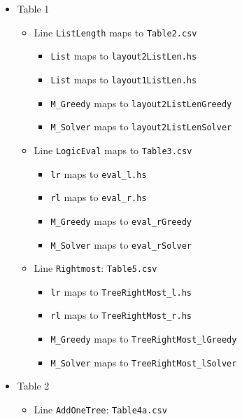 \begin{itemize}
\item
  Table 1

  \begin{itemize}
  \tightlist
  \item
    Line \texttt{ListLength} maps to \texttt{Table2.csv}

    \begin{itemize}
    \tightlist
    \item
      \texttt{List} maps to \texttt{layout2ListLen.hs}
    \item
      \texttt{List\textquotesingle{}} maps to \texttt{layout1ListLen.hs}
    \item
      \texttt{M\_Greedy} maps to \texttt{layout2ListLenGreedy}
    \item
      \texttt{M\_Solver} maps to \texttt{layout2ListLenSolver}
    \end{itemize}
  \item
    Line \texttt{LogicEval} maps to \texttt{Table3.csv}

    \begin{itemize}
    \tightlist
    \item
      \texttt{lr} maps to \texttt{eval\_l.hs}
    \item
      \texttt{rl} maps to \texttt{eval\_r.hs}
    \item
      \texttt{M\_Greedy} maps to \texttt{eval\_rGreedy}
    \item
      \texttt{M\_Solver} maps to \texttt{eval\_rSolver}
    \end{itemize}
  \item
    Line \texttt{Rightmost}: \texttt{Table5.csv}

    \begin{itemize}
    \tightlist
    \item
      \texttt{lr} maps to \texttt{TreeRightMost\_l.hs}
    \item
      \texttt{rl} maps to \texttt{TreeRightMost\_r.hs}
    \item
      \texttt{M\_Greedy} maps to \texttt{TreeRightMost\_lGreedy}
    \item
      \texttt{M\_Solver} maps to \texttt{TreeRightMost\_lSolver}
    \end{itemize}
  \end{itemize}
\item
  Table 2

  \begin{itemize}
  \tightlist
  \item
    Line \texttt{AddOneTree}: \texttt{Table4a.csv}


\end{itemize}
\end{itemize}

